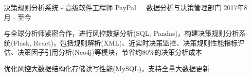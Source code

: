 \documentclass[11pt, a4paper, UTF8]{awesome-cv}
\begin{document}
%
\begin{cventries}
  \cventry
    {决策规则分析系统 - 高级软件工程师} %
    {PayPal{\ \cdotp\ \ }数据分析与决策管理部门} %
    {2017年8月 - 至今} %
    {\ } %
    {
      \begin{cvitems} %
        \item {与全球分析师紧密合作，进行风控数据分析(SQL, Pandas)，构建决策规则分析系统(Flask, React)，包括规则解析(XML)、近实时决策监控、决策规则性能指标评估、决策因子引用分析(Neo4j)等模块，节省约80\%的决策分析成本}
        \item {优化风控大数据结构化存储读写性能(MySQL)，支持全量大数据更新}
      \end{cvitems}
    }
    

\end{cventries}
\end{document}
